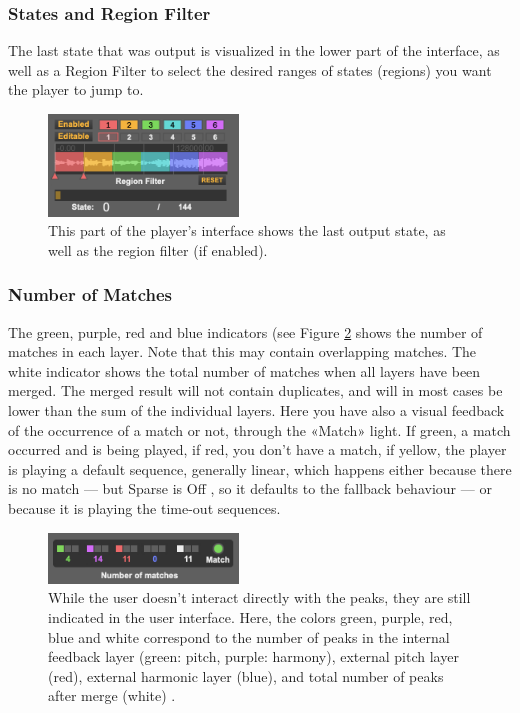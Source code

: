 \subsubsection{States and Region Filter} 
The last state that was output is visualized in the lower part of the interface, as well as a Region Filter to select the desired ranges of states (regions) you want the player to jump to. 

 \begin{figure}[h!]
    \centering        
 	\includegraphics[width=0.45\textwidth]{somax2-6-user-guide/img/region_filter.png}
    \caption{This part of the player's interface shows the last output state, as well as the region filter (if enabled).}
    \label{fig:state}
\end{figure}

\subsubsection{Number of Matches}
The green, purple, red and blue indicators (see Figure \ref{fig:peaks} shows the number of matches in each layer. Note that this may contain overlapping matches. The white indicator shows the total number of matches when all layers have been merged. The merged result will not contain duplicates, and will in most cases be lower than the sum of the individual layers. Here you have also a visual feedback of the occurrence of a match or not, through the «Match» light. If green, a match occurred and is being played, if red, you don't have a match, if yellow, the player is playing a default sequence, generally linear, which happens either because there is no match — but Sparse is Off , so it defaults to the fallback behaviour — or because it is playing the time-out sequences.

 \begin{figure}[h!]
    \centering        
 	\includegraphics[width=0.45\textwidth]{somax2-6-user-guide/img/matches.png}
    \caption{While the user doesn't interact directly with the peaks, they are still indicated in the user interface.    Here, the colors green, purple, red, blue and white correspond to the number of peaks in the internal feedback layer (green: pitch, purple: harmony), external pitch layer (red), external harmonic layer (blue), and total number of peaks after merge (white) .}
    \label{fig:peaks}
\end{figure}



